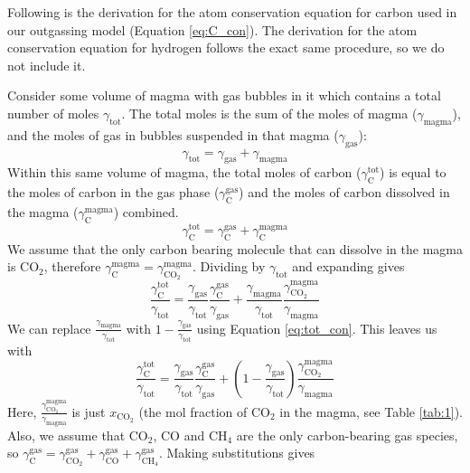 Following is the derivation for the atom conservation equation for carbon used in our outgassing model (Equation \eqref{eq:C_con}). The derivation for the atom conservation equation for hydrogen follows the exact same procedure, so we do not include it. 

Consider some volume of magma with gas bubbles in it which contains a total number of moles $\gamma_\mathrm{tot}$. The total moles is the sum of the moles of magma ($\gamma_\mathrm{magma}$), and the moles of gas in bubbles suspended in that magma ($\gamma_\mathrm{gas}$):
\begin{equation} \label{eq:tot_con}
    \gamma_\mathrm{tot} = \gamma_\mathrm{gas} + \gamma_\mathrm{magma}
\end{equation}
Within this same volume of magma, the total moles of carbon ($\gamma_\mathrm{C}^\mathrm{tot}$) is equal to the moles of carbon in the gas phase ($\gamma_\mathrm{C}^\mathrm{gas}$) and the moles of carbon dissolved in the magma ($\gamma_\mathrm{C}^\mathrm{magma}$) combined. 
\begin{equation} \label{eq:CO2_con}
    \gamma_\mathrm{C}^\mathrm{tot} = \gamma_\mathrm{C}^\mathrm{gas} + \gamma_\mathrm{C}^\mathrm{magma}
\end{equation}
We assume that the only carbon bearing molecule that can dissolve in the magma is CO$_2$, therefore $\gamma_\mathrm{C}^\mathrm{magma}=\gamma_\mathrm{CO_2}^\mathrm{magma}$. Dividing by $\gamma_\mathrm{tot}$ and expanding gives
\begin{equation} 
    \frac{\gamma_\mathrm{C}^\mathrm{tot}}{\gamma_\mathrm{tot}} = \frac{\gamma_\mathrm{gas}}{\gamma_\mathrm{tot}}\frac{\gamma_\mathrm{C}^\mathrm{gas}}{\gamma_\mathrm{gas}} + \frac{\gamma_\mathrm{magma}}{\gamma_\mathrm{tot}}\frac{\gamma_\mathrm{CO_2}^\mathrm{magma}}{\gamma_\mathrm{magma}}
\end{equation}
We can replace $\frac{\gamma_\mathrm{magma}}{\gamma_\mathrm{tot}}$ with $1-\frac{\gamma_\mathrm{gas}}{\gamma_\mathrm{tot}}$ using Equation \eqref{eq:tot_con}. This leaves us with
\begin{equation} 
    \frac{\gamma_\mathrm{C}^\mathrm{tot}}{\gamma_\mathrm{tot}} = \frac{\gamma_\mathrm{gas}}{\gamma_\mathrm{tot}}\frac{\gamma_\mathrm{C}^\mathrm{gas}}{\gamma_\mathrm{gas}} + \left(1-\frac{\gamma_\mathrm{gas}}{\gamma_\mathrm{tot}}\right)\frac{\gamma_\mathrm{CO_2}^\mathrm{magma}}{\gamma_\mathrm{magma}}
\end{equation}
Here, $\frac{\gamma_\mathrm{CO_2}^\mathrm{magma}}{\gamma_\mathrm{magma}}$ is just $x_\mathrm{CO_2}$ (the mol fraction of CO$_2$ in the magma, see Table \ref{tab:1}). Also, we assume that CO$_2$, CO and CH$_4$ are the only carbon-bearing gas species, so $\gamma_\mathrm{C}^\mathrm{gas}=\gamma_\mathrm{CO_2}^\mathrm{gas}+\gamma_\mathrm{CO}^\mathrm{gas}+\gamma_\mathrm{CH_4}^\mathrm{gas}$. Making substitutions gives
